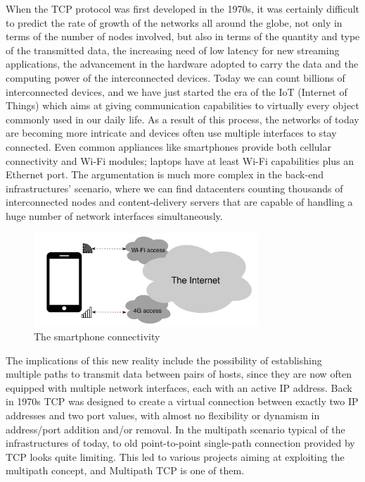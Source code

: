\vspace{5mm}
When the TCP protocol was first developed in the 1970s, it was certainly difficult to predict the rate of growth of the networks all around the globe, not only in terms of the number of nodes involved, but also in terms of the quantity and type of the transmitted data, the increasing need of low latency for new streaming applications, the advancement in the hardware adopted to carry the data and the computing power of the interconnected devices. Today we can count billions of interconnected devices, and we have just started the era of the IoT (Internet of Things) which aims at giving communication capabilities to virtually every object commonly used in our daily life.
As a result of this process, the networks of today are becoming more intricate and devices often use multiple interfaces to stay connected. Even common appliances like smartphones provide both cellular connectivity and Wi-Fi modules; laptops have at least Wi-Fi capabilities plus an Ethernet port. The argumentation is much more complex in the back-end infrastructures' scenario, where we can find datacenters counting thousands of interconnected nodes and content-delivery servers that are capable of handling a huge number of network interfaces simultaneously.

\begin{figure}[!htb]
\centering
\includegraphics[width=0.75\textwidth]{images/smartphones}
\caption{The smartphone connectivity}
\label{fig:smartphones}
\end{figure}

The implications of this new reality include the possibility of establishing multiple paths to transmit data between pairs of hosts, since they are now often equipped with multiple network interfaces, each with an active IP address. Back in 1970s TCP was designed to create a virtual connection between exactly two IP addresses and two port values, with almost no flexibility or dynamism in address/port addition and/or removal. In the multipath scenario typical of the infrastructures of today, to old point-to-point single-path connection provided by TCP looks quite limiting. This led to various projects aiming at exploiting the multipath concept, and Multipath TCP is one of them.


